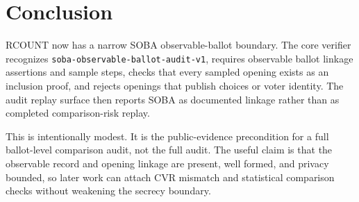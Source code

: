 \section{Conclusion}

RCOUNT now has a narrow SOBA observable-ballot boundary. The core verifier
recognizes \texttt{soba-observable-ballot-audit-v1}, requires observable
ballot linkage assertions and sample steps, checks that every sampled opening
exists as an inclusion proof, and rejects openings that publish choices or
voter identity. The audit replay surface then reports SOBA as documented
linkage rather than as completed comparison-risk replay.

This is intentionally modest. It is the public-evidence precondition for a
full ballot-level comparison audit, not the full audit. The useful claim is
that the observable record and opening linkage are present, well formed, and
privacy bounded, so later work can attach CVR mismatch and statistical
comparison checks without weakening the secrecy boundary.
